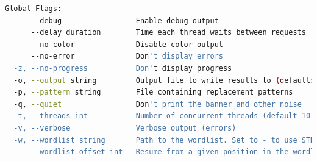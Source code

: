 \documentclass[12 pt]{article}
\begin{document}
\begin{lstlisting}[language=bash]
Global Flags:
      --debug                 Enable debug output
      --delay duration        Time each thread waits between requests (e.g. 1500ms)
      --no-color              Disable color output
      --no-error              Don't display errors
  -z, --no-progress           Don't display progress
  -o, --output string         Output file to write results to (defaults to stdout)
  -p, --pattern string        File containing replacement patterns
  -q, --quiet                 Don't print the banner and other noise
  -t, --threads int           Number of concurrent threads (default 10)
  -v, --verbose               Verbose output (errors)
  -w, --wordlist string       Path to the wordlist. Set to - to use STDIN.
      --wordlist-offset int   Resume from a given position in the wordlist (defaults to 0)
\end{lstlisting}
\end{document}
